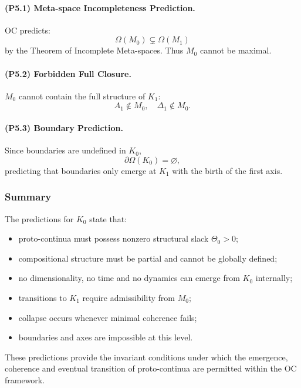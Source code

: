 \paragraph{(P5.1) Meta-space Incompleteness Prediction.}
OC predicts:
\[
\Omega(M_0) \subsetneq \Omega(M_1)
\]
by the Theorem of Incomplete Meta-spaces.
Thus $M_0$ cannot be maximal.

\paragraph{(P5.2) Forbidden Full Closure.}
$M_0$ cannot contain the full structure of $K_1$:
\[
A_1 \notin M_0,\quad \Delta_1 \notin M_0.
\]

\paragraph{(P5.3) Boundary Prediction.}
Since boundaries are undefined in $K_0$,
\[
\partial\Omega(K_0) = \varnothing,
\]
predicting that boundaries only emerge at $K_1$ with the birth of the first axis.

\subsubsection{Summary}

The predictions for $K_0$ state that:

\begin{itemize}
    \item proto-continua must possess nonzero structural slack $\Theta_0>0$;
    \item compositional structure must be partial and cannot be globally defined;
    \item no dimensionality, no time and no dynamics can emerge from $K_0$ internally;
    \item transitions to $K_1$ require admissibility from $M_0$;
    \item collapse occurs whenever minimal coherence fails;
    \item boundaries and axes are impossible at this level.
\end{itemize}

These predictions provide the invariant conditions under which
the emergence, coherence and eventual transition of proto-continua
are permitted within the OC framework.
